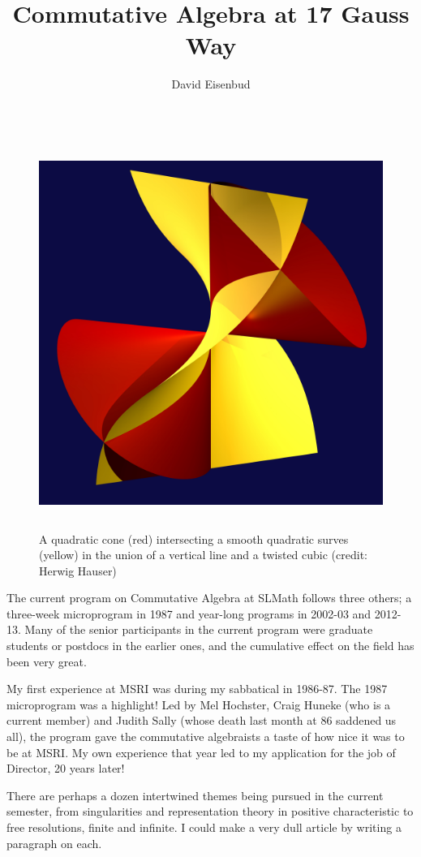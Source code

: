 \documentclass[11pt, oneside]{article}   	%
\title{Commutative Algebra at 17 Gauss Way}
\author{David Eisenbud}
\begin{document}
\maketitle

\begin{figure}\label{cubicAndLine}
\centerline {\includegraphics[height=5in]{"main/Fig15-1-TwistAndShout"}}
 \caption{A quadratic cone (red) intersecting a smooth quadratic surves (yellow) in the union of a vertical line and a twisted cubic (credit: Herwig Hauser)}
\end{figure}

The current program on Commutative Algebra at SLMath follows three others; a three-week microprogram in 1987 and year-long programs in 2002-03 and 2012-13. Many of the senior participants in the current program were graduate students or postdocs in the earlier ones, and the cumulative effect on the field has been very great.

My first experience at MSRI was during my sabbatical in 1986-87. The 1987 microprogram was a highlight! Led by Mel Hochster, Craig Huneke (who is a current member) and Judith Sally (whose death last month at 86 saddened us all), the program gave the commutative algebraists a taste of how nice it was to be at MSRI. My own experience that year led to my application for the job of Director, 20 years later!

There are perhaps a dozen intertwined themes being pursued in the current semester, from singularities and representation theory in positive characteristic to free resolutions, finite and infinite. I could make a very dull article by writing a paragraph on each. 
\end{document}
